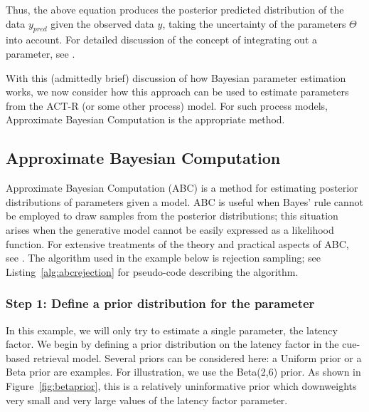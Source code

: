 \documentclass{cambridge7A}\usepackage[]{graphicx}\usepackage[]{color}
\begin{document}
Thus, the above equation produces the posterior predicted distribution of the data $y_{pred}$ given the observed data $y$, taking the uncertainty of the parameters $\Theta$ into account. For detailed discussion of the concept of integrating out a parameter, see \cite{lunn2012bugs,NicenboimEtAlBayes2019}.

With this (admittedly brief) discussion of how Bayesian parameter estimation works, we now consider how this approach can be used to estimate parameters from the ACT-R (or some other process) model. For such process models, Approximate Bayesian Computation is the appropriate method.


\subsection{Approximate Bayesian Computation}

 
Approximate Bayesian Computation (ABC) \citep{SissonABC} is a method for estimating posterior distributions of parameters given a model. ABC is useful when Bayes' rule cannot be employed to draw samples from the posterior distributions; this situation arises when the generative model cannot be easily expressed as a likelihood function. For extensive treatments of the theory and practical aspects of ABC, see \cite{SissonABC,palestro2018likelihood}.  The algorithm used in the example below is  rejection sampling; see Listing~\ref{alg:abcrejection} for pseudo-code describing the algorithm.

\subsubsection{Step 1: Define a prior distribution for the parameter}

In this example, we will only try to estimate a single parameter, the latency factor. We begin by defining a prior distribution on the latency factor in the cue-based retrieval model. Several priors can be considered here: a Uniform prior or a Beta prior are examples. For illustration, we use the Beta(2,6) prior. As shown in Figure~\ref{fig:betaprior}, this is a relatively uninformative prior which downweights very small and very large values of the latency factor parameter.
\end{document}
